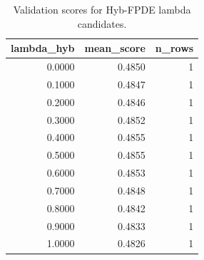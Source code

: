 \begin{table}[t]
\caption{Validation scores for Hyb-FPDE lambda candidates.}
\label{tab:lambda_distribution_computed}
\centering
\begin{tabular}{rrr}
\toprule
lambda\_hyb & mean\_score & n\_rows \\
\midrule
0.0000 & 0.4850 & 1 \\
0.1000 & 0.4847 & 1 \\
0.2000 & 0.4846 & 1 \\
0.3000 & 0.4852 & 1 \\
0.4000 & 0.4855 & 1 \\
0.5000 & 0.4855 & 1 \\
0.6000 & 0.4853 & 1 \\
0.7000 & 0.4848 & 1 \\
0.8000 & 0.4842 & 1 \\
0.9000 & 0.4833 & 1 \\
1.0000 & 0.4826 & 1 \\
\bottomrule
\end{tabular}

\end{table}
